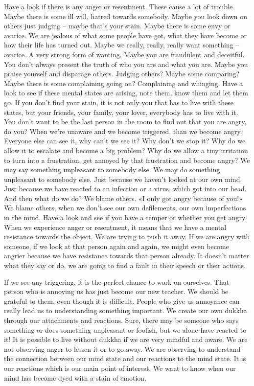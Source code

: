 \documentclass[letterpaper,10pt,english]{sphinxmanual}
\begin{document}
\sphinxAtStartPar
Have a look if there is any anger or resentment. These cause a lot of
trouble. Maybe there is some ill will, hatred towards somebody. Maybe you
look down on others just judging – maybe that’s your stain. Maybe there is
some envy or avarice. We are jealous of what some people have got, what
they have become or how their life has turned out. Maybe we really, really,
really  want  something  –  avarice.  A  very  strong  form  of  wanting.  Maybe
you are fraudulent and deceitful. You don’t always present the truth of who
  you are and what you are. Maybe you praise yourself and disparage others.
Judging others? Maybe some comparing? Maybe there is some complaining
going  on?  Complaining  and  whinging.  Have  a  look  to  see  if  these  mental
states are arising, note them, know them and let them go. If you don’t find
your  stain,  it  is  not  only  you  that  has  to  live  with  these  states,  but  your
friends,  your  family,  your  lover,  everybody  has  to  live  with  it.  You  don’t
want  to  be  the  last  person  in  the  room  to  find  out  that  you  are  angry,  do
you? When we’re unaware and we become triggered, than we become angry.
Everyone else can see it, why can’t we see it? Why don’t we stop it? Why
do we allow it to escalate and become a big problem? Why do we allow a
tiny irritation to turn into a frustration, get annoyed by that frustration and
become  angry?  We  may  say  something  unpleasant  to  somebody  else.  We
may  do  something  unpleasant  to  somebody  else.  Just  because  we  haven’t
looked at our own mind. Just because we have reacted to an infection or a
virus, which got into our head. And then what do we do? We blame others.
«I only got angry because of you!» We blame others, when we don’t see our
own defilements, our own imperfections in the mind. Have a look and see
if you have a temper or whether you get angry. When we experience anger
or resentment, it means that we have a mental resistance towards the object.
We are trying to push it away. If we are angry with someone, if we look at
that person again and again, we might even become angrier because we have
resistance towards that person already. It doesn’t matter what they say or do,
we are going to find a fault in their speech or their actions.

\sphinxAtStartPar
If we see any triggering, it is the perfect chance to work on ourselves.
That person who is annoying us has just become our new teacher. We should
be grateful to them, even though it is difficult. People who give us annoyance  can  really  lead  us  to  understanding  something  important.  We  create
our own dukkha through our attachments and reactions. Sure, there may be
someone who says something or does something unpleasant or foolish, but
we alone have reacted to it!
It is
possible to live without dukkha if we are very mindful and aware. We are not
observing anger to lessen it or to go away. We are observing to understand
the connection between our mind state and our reactions to the mind state. It
is our reactions which is our main point of interest. We want to know when
  our mind has become dyed with a stain of emotion.
\end{document}
